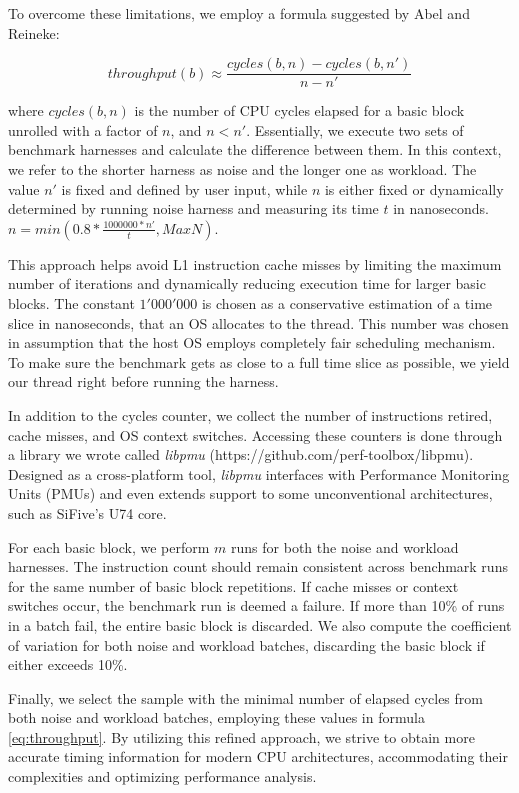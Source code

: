 To overcome these limitations, we employ a formula suggested by Abel and Reineke\cite{abelUiCAAccurateThroughput2022}:

\begin{equation}
throughput(b) \approx \frac{cycles(b, n) - cycles(b, n')}{n - n'}
  \label{eq:throughput}
\end{equation}

where $cycles(b, n)$ is the number of CPU cycles elapsed for a basic block unrolled with a factor of $n$, and $n < n'$. Essentially, we execute two sets of benchmark harnesses and calculate the difference between them. In this context, we refer to the shorter harness as noise and the longer one as workload. The value $n'$ is fixed and defined by user input, while $n$ is either fixed or dynamically determined by running noise harness and measuring its time $t$ in nanoseconds.
$n = min(0.8*\frac{1000000 * n'}{t}, MaxN)$.

This approach helps avoid L1 instruction cache misses by limiting the maximum number of iterations and dynamically reducing execution time for larger basic blocks. The constant $1'000'000$ is chosen as a conservative estimation of a time slice in nanoseconds, that an OS allocates to the thread. This number was chosen in assumption that the host OS employs completely fair scheduling mechanism. To make sure the benchmark gets as close to a full time slice as possible, we yield our thread right before running the harness.

In addition to the cycles counter, we collect the number of instructions retired, cache misses, and OS context switches. Accessing these counters is done through a library we wrote called \textit{libpmu} (https://github.com/perf-toolbox/libpmu). Designed as a cross-platform tool, \textit{libpmu} interfaces with Performance Monitoring Units (PMUs) and even extends support to some unconventional architectures, such as SiFive's U74 core.

For each basic block, we perform $m$ runs for both the noise and workload harnesses. The instruction count should remain consistent across benchmark runs for the same number of basic block repetitions. If cache misses or context switches occur, the benchmark run is deemed a failure. If more than 10\% of runs in a batch fail, the entire basic block is discarded. We also compute the coefficient of variation for both noise and workload batches, discarding the basic block if either exceeds 10\%.

Finally, we select the sample with the minimal number of elapsed cycles from both noise and workload batches, employing these values in formula \ref{eq:throughput}. By utilizing this refined approach, we strive to obtain more accurate timing information for modern CPU architectures, accommodating their complexities and optimizing performance analysis.

